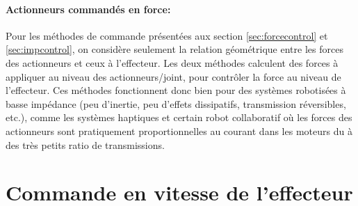 \paragraph{Actionneurs commandés en force:} Pour les méthodes de commande présentées aux section \ref{sec:forcecontrol} et \ref{sec:impcontrol}, on considère seulement la relation géométrique entre les forces des actionneurs et ceux à l'effecteur. Les deux méthodes calculent des forces à appliquer au niveau des actionneurs/joint, pour contrôler la force au niveau de l'effecteur. Ces méthodes fonctionnent donc bien pour des systèmes robotisées à basse impédance (peu d'inertie, peu d'effets dissipatifs, transmission réversibles, etc.), comme les systèmes haptiques et certain robot collaboratif où les forces des actionneurs sont pratiquement proportionnelles au courant dans les moteurs du à des très petits ratio de transmissions.



\newpage
\section{Commande en vitesse de l'effecteur}
\label{sec:speedcontrol}

